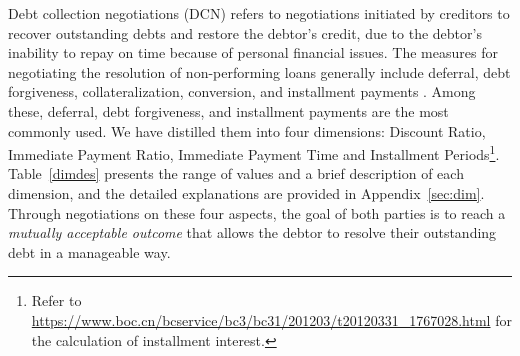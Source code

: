 \begin{table*}[ht]
\centering

\caption{\label{dimdes}Debt Collection Negotiation Dimensions}
\vspace{-0.1in}
    \vspace{-0.1in}
\end{table*}

Debt collection negotiations (DCN) refers to negotiations initiated by creditors to recover outstanding debts and restore the debtor’s credit, due to the debtor’s inability to repay on time because of personal financial issues. The measures for negotiating the resolution of non-performing loans generally include deferral, debt forgiveness, collateralization, conversion, and installment payments \citep{DFRatings2019,Lankao2023}. Among these, deferral, debt forgiveness, and installment payments are the most commonly used. We have distilled them into four dimensions: Discount Ratio, Immediate Payment Ratio, Immediate Payment Time and Installment Periods\footnote{Refer to \url{https://www.boc.cn/bcservice/bc3/bc31/201203/t20120331_1767028.html} for the calculation of installment interest.}. Table~\ref{dimdes} presents the range of values and a brief description of each dimension, and the detailed explanations are provided in Appendix~\ref{sec:dim}. Through negotiations on these four aspects, the goal of both parties is to reach a \textit{mutually acceptable outcome} that allows the debtor to resolve their outstanding debt in a manageable way.

